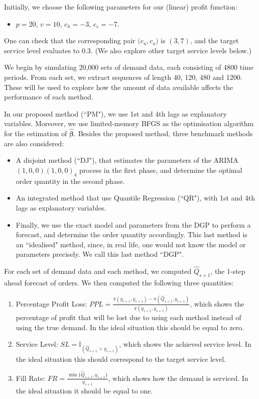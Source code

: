 \documentclass{article}
\begin{document}
Initially, we choose the following parameters for our (linear) profit function:
\begin{itemize}
    \item $p=20$, $v=10$, $c_h=-3$, $c_s=-7$.
\end{itemize}
One can check that the corresponding pair $\big( c_u,c_o \big)$ is $(3,7)$, and the target service level evaluates to $0.3$. (We also explore other target service levels below.)

We begin by simulating 20,000 sets of demand data, each consisting of 4800 time periods. From each set, we extract sequences of length 40, 120, 480 and 1200. These will be used to explore how the amount of data available affects the performance of each method.

In our proposed method (``PM"), we use 1st and 4th lags as explanatory variables. Moreover, we use limited-memory BFGS \cite{LN89} as the optimisation algorithm for the estimation of $\hat{\boldsymbol{\beta}}$. Besides the proposed method, three benchmark methods are also considered:
\begin{itemize}
    \item A disjoint method (``DJ"), that estimates the parameters of the ARIMA$(1,0,0)(1,0,0)_4$ process in the first phase, and determine the optimal order quantity in the second phase.
    \item An integrated method that use Quantile Regression (``QR"), with 1st and 4th lags as explanatory variables.
    \item Finally, we use the exact model and parameters from the DGP to perform a forecast, and determine the order quantity accordingly. This last method is an ``idealised" method, since, in real life, one would not know the model or parameters precisely. We call this last method ``DGP".
\end{itemize}

For each set of demand data and each method, we computed $\hat{Q}_{s+1}$, the 1-step ahead forecast of orders. We then computed the following three quantities:
\begin{enumerate}
    \item Percentage Profit Loss:  $PPL=\frac{\pi(y_{s+1},y_{s+1})-\pi(\hat{Q}_{s+1},y_{s+1})}{\pi(y_{s+1},y_{s+1})}$, which shows the percentage of profit that will be lost due to using each method instead of using the true demand. In the ideal situation this should be equal to zero.
    \item Service Level: $SL=\mathbb {I}_{(\hat{Q}_{s+1}>y_{s+1})}$, which shows the achieved service level. In the ideal situation this should correspond to the target service level.
    \item Fill Rate: $FR=\frac{\min\{\hat{Q}_{s+1},y_{s+1}\}}{y_{s+1}}$, which shows how the demand is serviced. In the ideal situation it should be equal to one.
\end{enumerate}
\end{document}
